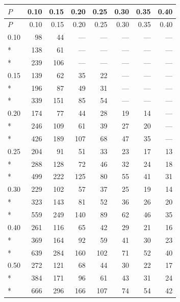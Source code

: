 {\small\setlength{\tabcolsep}{3.5pt}
\begin{longtable}{lrrrrrrr}
\toprule $P$ & 0.10 & 0.15 & 0.20 & 0.25 & 0.30 & 0.35 & 0.40\\\midrule
\endfirsthead
\toprule $P$ & 0.10 & 0.15 & 0.20 & 0.25 & 0.30 & 0.35 & 0.40\\\midrule
\endhead
0.10 & 98 & 44 & — & — & — & — & —\\*
 & 138 & 61 & — & — & — & — & —\\*
 & 239 & 106 & — & — & — & — & —\\\midrule
0.15 & 139 & 62 & 35 & 22 & — & — & —\\*
 & 196 & 87 & 49 & 31 & — & — & —\\*
 & 339 & 151 & 85 & 54 & — & — & —\\\midrule
0.20 & 174 & 77 & 44 & 28 & 19 & 14 & —\\*
 & 246 & 109 & 61 & 39 & 27 & 20 & —\\*
 & 426 & 189 & 107 & 68 & 47 & 35 & —\\\midrule
0.25 & 204 & 91 & 51 & 33 & 23 & 17 & 13\\*
 & 288 & 128 & 72 & 46 & 32 & 24 & 18\\*
 & 499 & 222 & 125 & 80 & 55 & 41 & 31\\\midrule
0.30 & 229 & 102 & 57 & 37 & 25 & 19 & 14\\*
 & 323 & 143 & 81 & 52 & 36 & 26 & 20\\*
 & 559 & 249 & 140 & 89 & 62 & 46 & 35\\\midrule
0.40 & 261 & 116 & 65 & 42 & 29 & 21 & 16\\*
 & 369 & 164 & 92 & 59 & 41 & 30 & 23\\*
 & 639 & 284 & 160 & 102 & 71 & 52 & 40\\\midrule
0.50 & 272 & 121 & 68 & 44 & 30 & 22 & 17\\*
 & 384 & 171 & 96 & 61 & 43 & 31 & 24\\*
 & 666 & 296 & 166 & 107 & 74 & 54 & 42\\\midrule
\end{longtable}}

